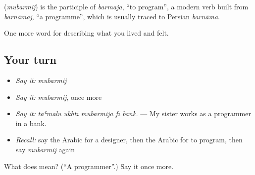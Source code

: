\begin{cousinweb}
\textbf{} (\emph{mubarmij}) is the participle of \emph{barmaja}, \textquotedblleft{}to program\textquotedblright{}, a modern verb built from \emph{barnāmaj}, \textquotedblleft{}a programme\textquotedblright{}, which is usually traced to Persian \emph{barnāma}.
\end{cousinweb}

\begin{grammarlens}[title={What you've built}]
One more word for describing what you lived and felt.
\end{grammarlens}

\subsection*{Your turn}
\begin{itemize}
\raggedright
  \item \emph{Say it:} \emph{mubarmij}
  \item \emph{Say it:} \emph{mubarmij}, once more
  \item \emph{Say it:} \emph{taʿmalu ukhtī mubarmija fī bank.} — My sister works as a programmer in a bank.
  \item \emph{Recall:} say the Arabic for a designer, then the Arabic for to program, then say \emph{mubarmij} again
\end{itemize}

\begin{tcolorbox}[breakable,colback=teal!4,colframe=teal!35!black,title={Before you move on}]
What does  mean? (\textquotedblleft{}A programmer\textquotedblright{}.) Say it once more.
\end{tcolorbox}
